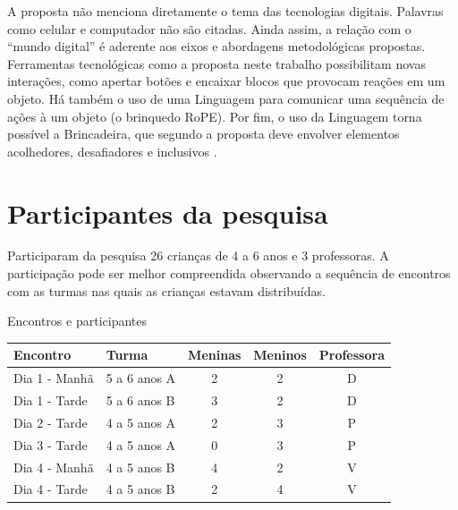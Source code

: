 A proposta não menciona diretamente o tema das tecnologias digitais. Palavras como celular e computador não são citadas. Ainda assim, a relação com o “mundo digital” é aderente aos eixos e abordagens metodológicas propostas. Ferramentas tecnológicas como a proposta neste trabalho possibilitam novas interações, como apertar botões e encaixar blocos que provocam reações em um objeto. Há também o uso de uma Linguagem para comunicar uma sequência de ações à um objeto (o brinquedo RoPE). Por fim, o uso da Linguagem torna possível a Brincadeira, que segundo a proposta deve envolver elementos acolhedores, desafiadores e inclusivos \cite[p.50]{gaspar_proposta_2010}. 


\section{Participantes da pesquisa}
\label{sec:participantes}
Participaram da pesquisa 26 crianças de 4 a 6 anos e 3 professoras. A participação pode ser melhor compreendida observando a sequência de encontros com as turmas nas quais as crianças estavam distribuídas.
 \begin{quadro}[!htbp]
 		\setlength{\extrarowheight}{5pt}
        \begin{center}
        \caption{Encontros e participantes}
        \label{quadro:participants}
        \begin{tabular}{@{}llccc@{}}
            \toprule
            Encontro & Turma & \multicolumn{1}{l}{Meninas} & \multicolumn{1}{l}{Meninos} & \multicolumn{1}{l}{Professora} \\ \midrule
            Dia 1 - Manhã & 5 a 6 anos A & 2 & 2 & D \\
            Dia 1 - Tarde & 5 a 6 anos B & 3 & 2 & D \\
            Dia 2 - Tarde & 4 a 5 anos A & 2 & 3 & P \\
            Dia 3 - Tarde & 4 a 5 anos A & 0 & 3 & P \\
            Dia 4 - Manhã & 4 a 5 anos B & 4 & 2 & V \\
            Dia 4 - Tarde & 4 a 5 anos B & 2 & 4 & V \\ \bottomrule
            \end{tabular}
        \end{center}
        \sourceauthor
    \end{quadro}

